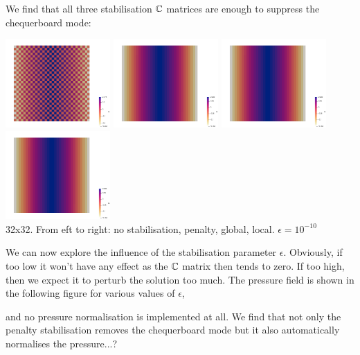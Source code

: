 We find that all three stabilisation ${\mathbb{C}}$ matrices are enough to suppress the chequerboard mode:
\begin{center}
\includegraphics[width=4cm]{python_codes/fieldstone_115/results/dh/nostab/press}
\includegraphics[width=4cm]{python_codes/fieldstone_115/results/dh/penalty/press}
\includegraphics[width=4cm]{python_codes/fieldstone_115/results/dh/global/press}
\includegraphics[width=4cm]{python_codes/fieldstone_115/results/dh/local/press}\\
{\captionfont 32x32. From eft to right: no stabilisation, penalty, global, local. $\epsilon=10^{-10}$}
\end{center}

We can now explore the influence of the stabilisation parameter $\epsilon$. Obviously, 
if too low it won't have any effect as the ${\mathbb{C}}$ matrix then tends to zero. If too high,
then we expect it to perturb the solution too much. 
The pressure field is shown in the following figure for various values of $\epsilon$, 

and no pressure normalisation is implemented at all. We find that not only the 
penalty stabilisation removes the chequerboard mode but it also automatically 
normalises the pressure...?  

